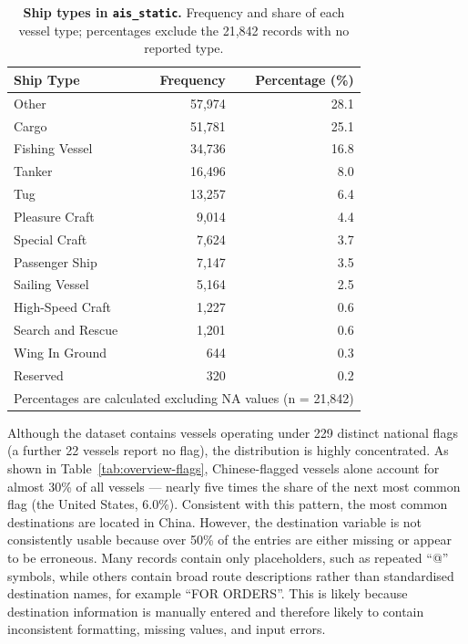 \documentclass[10pt,a4paper]{article}
\begin{document}
\begin{table}[ht]
\caption{\textbf{Ship types in \texttt{ais\_static}.} Frequency and share of each vessel type; percentages exclude the 21,842 records with no reported type.}
\label{tab:overview-ship-types}
\vspace{0.2cm}
\centering
\small
\begin{tabular}{@{}lrr@{}}
\toprule
{\bfseries Ship Type} & {\bfseries Frequency} & {\bfseries Percentage (\%)} \\
\midrule
Other              & 57,974 & 28.1 \\
Cargo              & 51,781 & 25.1 \\
Fishing Vessel     & 34,736 & 16.8 \\
Tanker             & 16,496 &  8.0 \\
Tug                & 13,257 &  6.4 \\
Pleasure Craft     &  9,014 &  4.4 \\
Special Craft      &  7,624 &  3.7 \\
Passenger Ship     &  7,147 &  3.5 \\
Sailing Vessel     &  5,164 &  2.5 \\
High-Speed Craft   &  1,227 &  0.6 \\
Search and Rescue  &  1,201 &  0.6 \\
Wing In Ground     &    644 &  0.3 \\
Reserved           &    320 &  0.2 \\
\midrule
\multicolumn{3}{l}{Percentages are calculated excluding NA values (n = 21,842)} \\
\bottomrule
\end{tabular}
\end{table}

Although the dataset contains vessels operating under 229 distinct national flags (a
further 22 vessels report no flag), the distribution is highly concentrated. As shown
in Table~\ref{tab:overview-flags}, Chinese-flagged vessels alone account for almost
30\% of all vessels --- nearly five times the share of the next most common flag (the
United States, 6.0\%). Consistent with this pattern, the most common destinations are
located in China. However, the destination variable is not consistently usable because
over 50\% of the entries are either missing or appear to be erroneous. Many records
contain only placeholders, such as repeated ``@'' symbols, while others contain broad
route descriptions rather than standardised destination names, for example
``FOR ORDERS''. This is likely because destination information is manually entered and
therefore likely to contain inconsistent formatting, missing values, and input errors.
\end{document}
